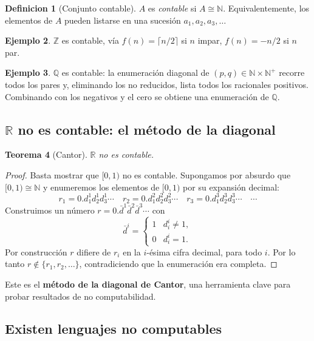 \documentclass[11pt,a4paper]{article}
\theoremstyle{plain}
\newtheorem{teorema}{Teorema}[section]
\theoremstyle{definition}
\newtheorem{definicion}[teorema]{Definicion}
\newtheorem{ejemplo}[teorema]{Ejemplo}
\theoremstyle{remark}
\begin{document}
\begin{definicion}[Conjunto contable]
$A$ es \emph{contable} si $A\cong\mathbb N$. Equivalentemente, los elementos
de $A$ pueden listarse en una sucesi\'on $a_1,a_2,a_3,\dots$
\end{definicion}

\begin{ejemplo}
$\mathbb Z$ es contable, v\'ia
$f(n)=\lceil n/2\rceil$ si $n$ impar, $f(n)=-n/2$ si $n$ par.
\end{ejemplo}

\begin{ejemplo}
$\mathbb Q$ es contable: la enumeraci\'on diagonal de $(p,q)\in\mathbb N\times\mathbb N^+$ recorre todos los pares y, eliminando los no
reducidos, lista todos los racionales positivos. Combinando con los
negativos y el cero se obtiene una enumeraci\'on de $\mathbb Q$.
\end{ejemplo}

\subsection{$\mathbb R$ no es contable: el m\'etodo de la diagonal}

\begin{teorema}[Cantor]
$\mathbb R$ no es contable.
\end{teorema}

\begin{proof}
Basta mostrar que $[0,1)$ no es contable. Supongamos por absurdo que
$[0,1)\cong\mathbb N$ y enumeremos los elementos de $[0,1)$ por su expansi\'on
decimal:
\[
  r_1 = 0.d_1^1 d_2^1 d_3^1 \cdots
  \quad
  r_2 = 0.d_1^2 d_2^2 d_3^2 \cdots
  \quad
  r_3 = 0.d_1^3 d_2^3 d_3^3 \cdots
  \quad \cdots
\]
Construimos un n\'umero $r=0.\bar d^1 \bar d^2 \bar d^3 \cdots$ con
\[
  \bar d^i = \begin{cases} 1 & d_i^i \neq 1,\\ 0 & d_i^i = 1.\end{cases}
\]
Por construcci\'on $r$ difiere de $r_i$ en la $i$-\'esima cifra decimal,
para todo $i$. Por lo tanto $r\notin\{r_1,r_2,\dots\}$, contradiciendo que
la enumeraci\'on era completa.
\end{proof}

Este es el \textbf{m\'etodo de la diagonal de Cantor}, una herramienta clave
para probar resultados de no computabilidad.

\subsection{Existen lenguajes no computables}
\end{document}
